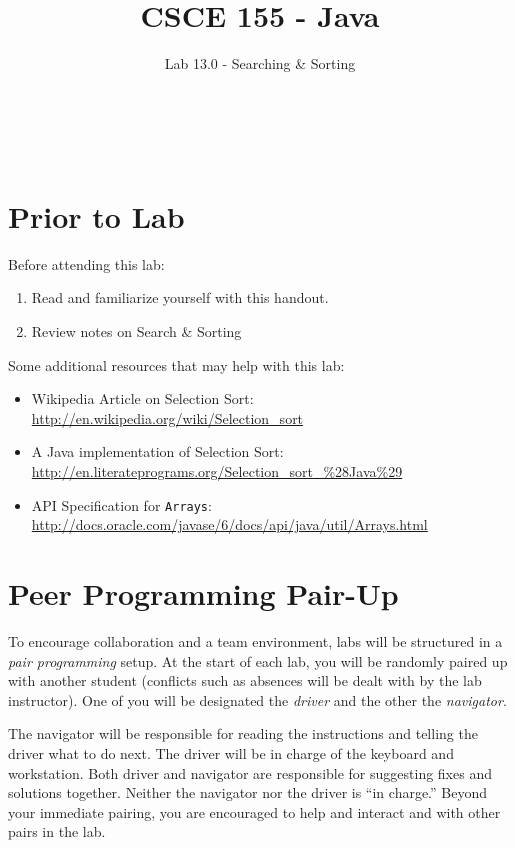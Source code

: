 \documentclass[12pt]{scrartcl}
\title{CSCE 155 - Java}
\subtitle{Lab 13.0 - Searching \& Sorting}
\author{~}
\date{~}
\begin{document}
\maketitle

\section*{Prior to Lab}

Before attending this lab:
\begin{enumerate}
  \item Read and familiarize yourself with this handout.
  \item Review notes on Search \& Sorting
\end{enumerate}

Some additional resources that may help with this lab:
\begin{itemize}
  \item Wikipedia Article on Selection Sort: \\
  	\url{http://en.wikipedia.org/wiki/Selection_sort}
  \item A Java implementation of Selection Sort:\\
  	\url{http://en.literateprograms.org/Selection_sort_%28Java%29}
  \item API Specification for \texttt{Arrays}: 
	\url{http://docs.oracle.com/javase/6/docs/api/java/util/Arrays.html}
\end{itemize}

\section*{Peer Programming Pair-Up}

To encourage collaboration and a team environment, labs will be
structured in a \emph{pair programming} setup.  At the start of
each lab, you will be randomly paired up with another student 
(conflicts such as absences will be dealt with by the lab instructor).
One of you will be designated the \emph{driver} and the other
the \emph{navigator}.  

The navigator will be responsible for reading the instructions and
telling the driver what to do next.  The driver will be in charge of the
keyboard and workstation.  Both driver and navigator are responsible
for suggesting fixes and solutions together.  Neither the navigator
nor the driver is ``in charge.''  Beyond your immediate pairing, you
are encouraged to help and interact and with other pairs in the lab.
\end{document}
